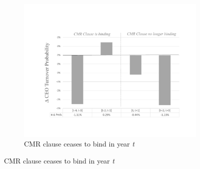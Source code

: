 \documentclass[a4paper,12pt]{article}
\begin{document}
\begin{singlespace}
\begin{figure}[ht]
     \skipline \skipline
     \begin{subfigure}[b]{\textwidth}
        \caption{CMR clause ceases to bind in year \textit{t}} \label{fig:turnover_post}
     	\centering
     	\includegraphics[trim=2cm 2cm 2cm 4cm,clip=true,width=12cm,keepaspectratio]{./figures/cmr_end.pdf}
     \end{subfigure}

\end{figure}
\egroup




\end{singlespace}
\end{document}
